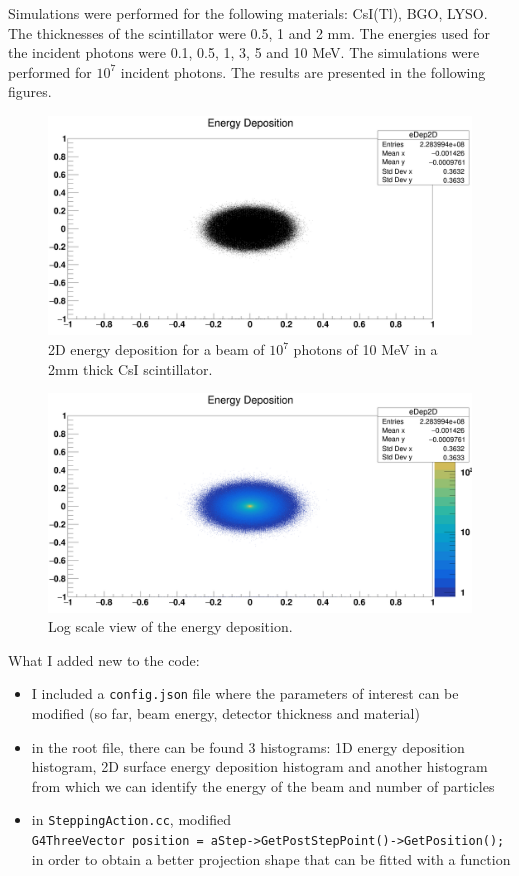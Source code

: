 \documentclass{article}
\begin{document}
Simulations were performed for the following materials: CsI(Tl), BGO, LYSO. The thicknesses 
of the scintillator were 0.5, 1 and 2 mm. The energies used for the incident photons were 0.1, 0.5, 1, 3, 5 and 10 MeV. 
The simulations were performed for $10^7$ incident photons. The results are presented in the following figures.

\begin{figure}[H]
  \centering
    \includegraphics[width=\linewidth]{images/task4/surface_CsI_10_2.png}
    \caption{2D energy deposition for a beam of $10^7$ photons of 10 MeV in a 2mm thick CsI scintillator.}
\end{figure}
\begin{figure}[H]
  \centering
    \includegraphics[width=\linewidth]{images/task4/logsurface_CsI_10_2.png}
    \caption{Log scale view of the energy deposition.}
\end{figure}

What I added new to the code:

\begin{itemize}
  \item I included a \verb|config.json| file where the parameters of interest can be modified (so far, beam energy, detector thickness and material)
  \item in the root file, there can be found 3 histograms: 1D energy deposition histogram, 2D surface energy deposition histogram and another histogram 
  from which we can identify the energy of the beam and number of particles
  \item in \verb|SteppingAction.cc|, modified \\ \verb|G4ThreeVector position = aStep->GetPostStepPoint()->GetPosition();| in order to obtain a better projection shape that can be fitted with a function
\end{itemize}
\end{document}
